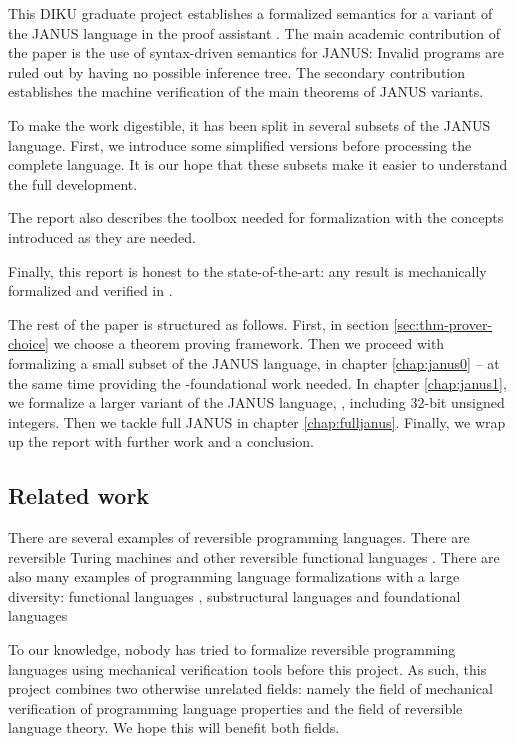 This DIKU graduate project establishes a formalized semantics for
a variant of the JANUS language in the proof assistant \coq{}. The
main academic contribution of the paper is the use of syntax-driven
semantics for JANUS: Invalid programs are ruled out by having no possible
inference tree. The secondary contribution establishes the machine
verification of the main theorems of JANUS variants.

To make the work digestible, it has been split in several subsets of
the JANUS language. First, we introduce some simplified versions
before processing the complete language. It is our hope that these
subsets make it easier to understand the full development.

The report also describes the toolbox needed for formalization with
the concepts introduced as they are needed.

Finally, this report is honest to the state-of-the-art: any result is
mechanically formalized and verified in \coq{}.

The rest of the paper is structured as follows. First, in section
\ref{sec:thm-prover-choice} we choose a theorem proving
framework. Then we proceed with formalizing a small subset of the
JANUS language, \janusz{} in chapter \ref{chap:janus0} -- at the same
time providing the \coq{}-foundational work needed. In chapter
\ref{chap:janus1}, we formalize a larger variant of the JANUS
language, \januso{}, including 32-bit unsigned integers. Then we
tackle full JANUS in chapter \ref{chap:fulljanus}. Finally, we wrap up
the report with further work and a conclusion.

\subsection{Related work}

There are several examples of reversible programming languages. There
are reversible Turing machines \cite{morita+2007:reversible-tm} and
other reversible functional languages
\cite{glueck+2005:program-inverter}. There are also many examples of
programming language formalizations with a large diversity: functional
languages \cite{leroy+2009:coinductive-big-step}, substructural
languages \cite{fluett+2007:phd-thesis} and foundational languages
\cite{jlouis+2007:bachelor}

To our knowledge, nobody has tried to formalize reversible programming
languages using mechanical verification tools before this project. As
such, this project combines two otherwise unrelated fields: namely the
field of mechanical verification of programming language properties
and the field of reversible language theory. We hope this will benefit
both fields.


